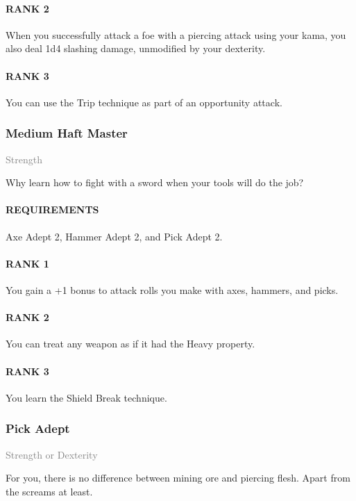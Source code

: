 \paragraph{RANK 2} When you successfully attack a foe with a piercing attack using your kama, you also deal 1d4 slashing damage, unmodified by your dexterity.
\paragraph{RANK 3} You can use the Trip technique as part of an opportunity attack.

\subsubsection{Medium Haft Master} \label{feat::mediumhaftmaster}
\small{\textcolor{gray}{Strength}}

\normalsize
Why learn how to fight with a sword when your tools will do the job?
\paragraph{REQUIREMENTS} Axe Adept 2, Hammer Adept 2, and Pick Adept 2.
\paragraph{RANK 1} You gain a +1 bonus to attack rolls you make with axes, hammers, and picks.
\paragraph{RANK 2} You can treat any weapon as if it had the Heavy property.
\paragraph{RANK 3} You learn the Shield Break technique.

\subsubsection{Pick Adept} \label{feat::pickadept}
\small{\textcolor{gray}{Strength or Dexterity}}

\normalsize
For you, there is no difference between mining ore and piercing flesh.
Apart from the screams at least.
